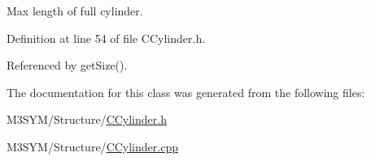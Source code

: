 Max length of full cylinder. 



Definition at line 54 of file C\+Cylinder.\+h.



Referenced by get\+Size().



The documentation for this class was generated from the following files\+:\begin{DoxyCompactItemize}
\item 
M3\+S\+Y\+M/\+Structure/\hyperlink{CCylinder_8h}{C\+Cylinder.\+h}\item 
M3\+S\+Y\+M/\+Structure/\hyperlink{CCylinder_8cpp}{C\+Cylinder.\+cpp}\end{DoxyCompactItemize}

